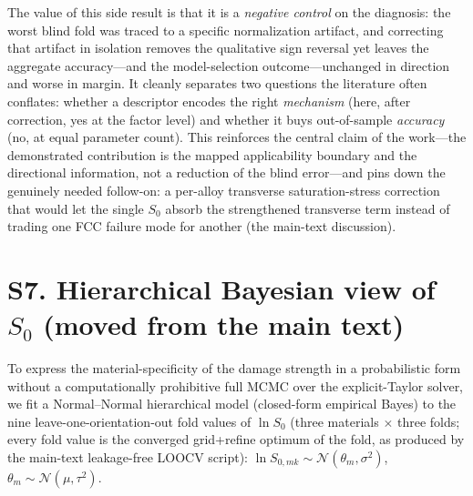 \documentclass[12pt,a4paper,twocolumn]{article}
\begin{document}
The value of this side result is that it is a \emph{negative control} on the diagnosis: the worst blind fold was traced to a specific normalization artifact, and correcting that artifact in isolation removes the qualitative sign reversal yet leaves the aggregate accuracy---and the model-selection outcome---unchanged in direction and worse in margin. It cleanly separates two questions the literature often conflates: whether a descriptor encodes the right \emph{mechanism} (here, after correction, yes at the factor level) and whether it buys out-of-sample \emph{accuracy} (no, at equal parameter count). This reinforces the central claim of the work---the demonstrated contribution is the mapped applicability boundary and the directional information, not a reduction of the blind error---and pins down the genuinely needed follow-on: a per-alloy transverse saturation-stress correction that would let the single $S_0$ absorb the strengthened transverse term instead of trading one FCC failure mode for another (the main-text discussion).

\section*{S7. Hierarchical Bayesian view of $S_0$ (moved from the main text)}

To express the material-specificity of the damage strength in a probabilistic form without a computationally prohibitive full MCMC over the explicit-Taylor solver, we fit a Normal--Normal hierarchical model (closed-form empirical Bayes) to the nine leave-one-orientation-out fold values of $\ln S_0$ (three materials $\times$ three folds; every fold value is the converged grid+refine optimum of the fold, as produced by the main-text leakage-free LOOCV script): $\ln S_{0,mk} \sim \mathcal{N}(\theta_m, \sigma^2)$, $\theta_m \sim \mathcal{N}(\mu, \tau^2)$.
\end{document}
